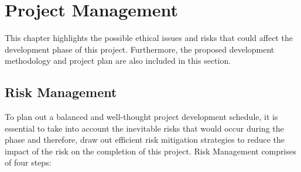 
\chapter{Project Management} %

\label{Project Management} %


This chapter highlights the possible ethical issues and risks that could affect the 
development phase of this project. Furthermore, the proposed development methodology and 
project plan are also included in this section.

\section{Risk Management}
To plan out a balanced and well-thought project development schedule, it is essential 
to take into account the inevitable risks that would occur during the phase and therefore, draw out 
efficient risk mitigation strategies to reduce the impact of the risk on the completion 
of this project. Risk Management comprises of four steps:

